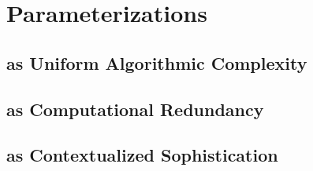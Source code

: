 \chapter{Parameterizations}








\section{as Uniform Algorithmic Complexity}


\section{as Computational Redundancy}


\section{as Contextualized Sophistication}

